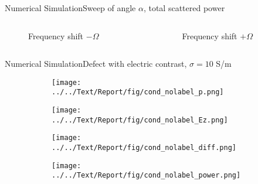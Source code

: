 \documentclass[11pt, final]{beamer}
\begin{document}
	\begin{frame}{Numerical Simulation}{Sweep of angle $\alpha$, total scattered power}
		\begin{columns}
			\begin{column}{0.5\textwidth}
				\begin{figure}
					\centering
					\resizebox{\textwidth}{!}{}
					\caption*{Frequency shift $-\Omega$}
				\end{figure}
			\end{column}
			\begin{column}{0.5\textwidth}
				\begin{figure}
					\centering
					\resizebox{\textwidth}{!}{}
					\caption*{Frequency shift $+ \Omega$}
				\end{figure}
			\end{column}
		\end{columns}
	\end{frame}
		
	\begin{frame}{Numerical Simulation}{Defect with electric contrast, $\sigma = 10$ S/m}
		\begin{figure}
			\centering
			\begin{subfigure}{0.5\textheight}
				\texttt{[image: ../../Text/Report/fig/cond\_nolabel\_p.png]}
			\end{subfigure}
			\begin{subfigure}{0.5\textheight}
				\texttt{[image: ../../Text/Report/fig/cond\_nolabel\_Ez.png]}
			\end{subfigure}
			\begin{subfigure}{0.5\textheight}
				\texttt{[image: ../../Text/Report/fig/cond\_nolabel\_diff.png]}
			\end{subfigure}
			\begin{subfigure}{0.5\textheight}
				\texttt{[image: ../../Text/Report/fig/cond\_nolabel\_power.png]}
			\end{subfigure}
		\end{figure}
	\end{frame}
	
\end{document}
